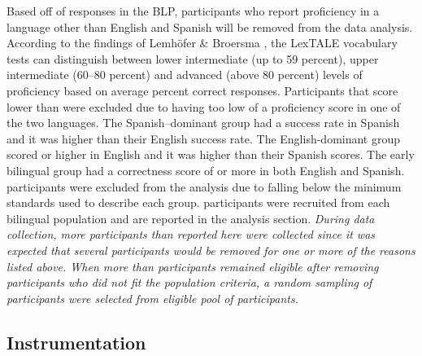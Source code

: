 \documentclass[
12pt, %
english, %
doublespacing, %
nolistspacing, %
liststotoc, %
headsepline, %
chapterinoneline, %
openany, %
]{DoctoralThesis}\usepackage[]{graphicx}\usepackage[]{color}
\begin{document}
Based off of responses in the BLP, participants who report proficiency in a language other than English and Spanish will be removed from the data analysis. According to the findings of Lemhöfer \& Broersma \parencite*{Lemhofer2012-hz}, the LexTALE vocabulary tests can distinguish between lower intermediate (up to 59 percent), upper intermediate (60–80 percent) and advanced (above 80 percent) levels of proficiency based on average percent correct responses. Participants that score lower than %
were excluded due to having too low of a proficiency score in one of the two languages. The Spanish–dominant group had a %
success rate in Spanish and it was higher than their English success rate. The English-dominant group scored %
or higher in English and it was higher than their Spanish scores. The early bilingual group had a correctness score of %
or more in both English and Spanish. %
participants were excluded from the analysis due to falling below the minimum standards used to describe each group.%
participants were recruited from each bilingual population and are reported in the analysis section. \emph{During data collection, more participants than reported here were collected since it was expected that several participants would be removed for one or more of the reasons listed above. When more than %
participants remained eligible after removing participants who did not fit the population criteria, a random sampling of%
participants were selected from eligible pool of participants.}



\subsection{Instrumentation}
\end{document}
